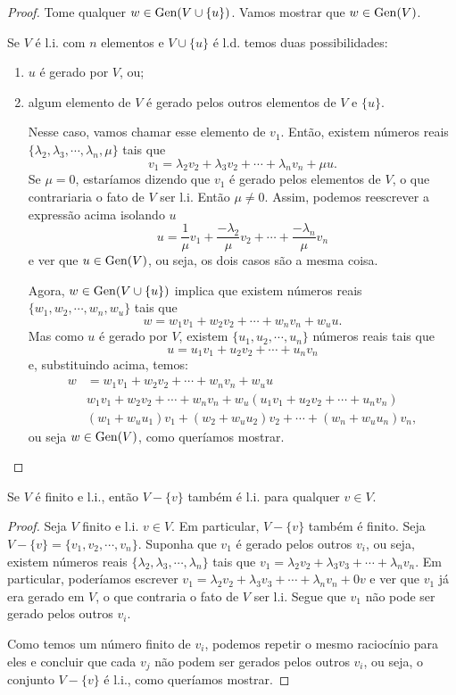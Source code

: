 \begin{proof}
	Tome qualquer $w\in\operatorname{Gen}(V\cup\{u\})$. Vamos mostrar que $w\in\operatorname{Gen}(V)$. 
	
	Se $V$ é l.i. com $n$ elementos e $V\cup \{u\}$ é l.d. temos duas possibilidades:
	\begin{enumerate}[1)]
		\item $u$ é gerado por $V$, ou;
		\item algum elemento de $V$ é gerado pelos outros elementos de $V$ e $\{u\}$.
		
		Nesse caso, vamos chamar esse elemento de $v_1$. Então, existem números reais $\{\lambda_2,\lambda_3,\cdots,\lambda_n,\mu\}$ tais que $$v_1=\lambda_2v_2+\lambda_3v_2+\cdots+\lambda_nv_n+\mu u.$$Se $\mu=0$, estaríamos dizendo que $v_1$ é gerado pelos elementos de $V$, o que contrariaria o fato de $V$ ser l.i. Então $\mu\neq 0$. Assim, podemos reescrever a expressão acima isolando $u$
		\[u=\frac{1}{\mu}v_1+\frac{-\lambda_2}{\mu}v_2+\cdots+\frac{-\lambda_n}{\mu}v_n\]e ver que $u\in\operatorname{Gen}(V)$, ou seja, os dois casos são a mesma coisa.
		
		Agora, $w\in\operatorname{Gen}(V\cup\{u\})$ implica que existem números reais $\{w_1,w_2,\cdots,w_n,w_u\}$ tais que
		\[w=w_1v_1+w_2v_2+\cdots+w_nv_n+w_uu.\] Mas como $u$ é gerado por $V$, existem $\{u_1,u_2,\cdots,u_n\}$ números reais tais que
		\[u=u_1v_1+u_2v_2+\cdots+u_nv_n\]e, substituindo acima, temos:
		\begin{align*}
			w&=w_1v_1+w_2v_2+\cdots+w_nv_n+w_uu\\
			&w_1v_1+w_2v_2+\cdots+w_nv_n+w_u(u_1v_1+u_2v_2+\cdots+u_nv_n)\\
			&(w_1+w_uu_1)v_1+(w_2+w_uu_2)v_2+\cdots+(w_n+w_uu_n)v_n,
		\end{align*}ou seja $w\in\operatorname{Gen}(V)$, como queríamos mostrar.
	\end{enumerate}
\end{proof}
\begin{lemma}
	Se $V$ é finito e l.i., então $V-\{v\}$ também é l.i. para qualquer $v\in V$.
\end{lemma}
\begin{proof}
	Seja $V$ finito e l.i. $v\in V$. Em particular, $V-\{v\}$ também é finito. Seja $V-\{v\}=\{v_1,v_2,\cdots,v_n\}$. Suponha que $v_1$ é gerado pelos outros $v_i$, ou seja, existem números reais $\{\lambda_2,\lambda_3,\cdots,\lambda_n\}$ tais que $v_1=\lambda_2v_2+\lambda_3v_3+\cdots+\lambda_nv_n$. Em particular, poderíamos escrever $v_1=\lambda_2v_2+\lambda_3v_3+\cdots+\lambda_nv_n+0v$ e ver que $v_1$ já era gerado em $V$, o que contraria o fato de $V$ ser l.i. Segue que $v_1$ não pode ser gerado pelos outros $v_i$.
	
	Como temos um número finito de $v_i$, podemos repetir o mesmo raciocínio para eles e concluir que cada $v_j$ não podem ser gerados pelos outros $v_i$, ou seja, o conjunto $V-\{v\}$ é l.i., como queríamos mostrar.
\end{proof}

